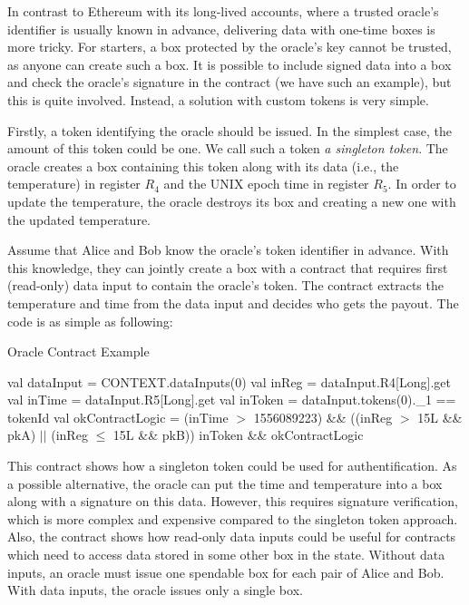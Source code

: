  In contrast to Ethereum with its long-lived accounts, where a trusted oracle's identifier is usually known in advance, delivering data with one-time boxes is more tricky. For starters, a box protected by the oracle's key cannot be trusted, as anyone can create such a box. It is possible to include signed data into a box and check the oracle's signature in the contract (we have such an example), but this is quite involved. Instead, a solution with custom
 tokens is very simple.

 Firstly, a token identifying the oracle should be issued. In the simplest case, the amount of this token could be one. We call such a token {\em a singleton token}. The oracle creates a box containing this token along with its data (i.e., the temperature) in register $R_4$ and the UNIX epoch time in register $R_5$.
 In order to update the temperature, the oracle destroys its box and creating a new one with the updated temperature.

 Assume that Alice and Bob know the oracle's token identifier in advance. With this knowledge, they can jointly create a box with a contract that requires first (read-only) data input to contain the oracle's token. The contract extracts the temperature and time from the data input
 and decides who gets the payout. The code is as simple as following:

 \begin{algorithm}[H]
    \caption{Oracle Contract Example}
    \label{alg:oracle}
    \begin{algorithmic}[1]
        \State val dataInput = CONTEXT.dataInputs(0)
        \State val inReg = dataInput.R4[Long].get
        \State val inTime = dataInput.R5[Long].get
        \State val inToken = dataInput.tokens(0).\_1 == tokenId
        \State val okContractLogic = (inTime $>$ 1556089223) \&\&
        \State\hspace{\algorithmicindent}\hspace{\algorithmicindent} ((inReg $>$ 15L \&\& pkA) $||$ (inReg $\le$ 15L \&\& pkB))
        \State inToken \&\& okContractLogic
    \end{algorithmic}
 \end{algorithm}

 This contract shows how a singleton token could be used for authentification. As a possible alternative, the oracle
 can put the time and temperature into a box along with a signature on this data. However, this requires signature verification, which is more complex and expensive compared to
 the singleton token approach. Also, the contract shows how read-only data inputs could be useful for contracts which need to access data stored in some other box in the state. Without data inputs, an oracle must issue one spendable box for each
 pair of Alice and Bob. With data inputs, the oracle issues only a single box.


